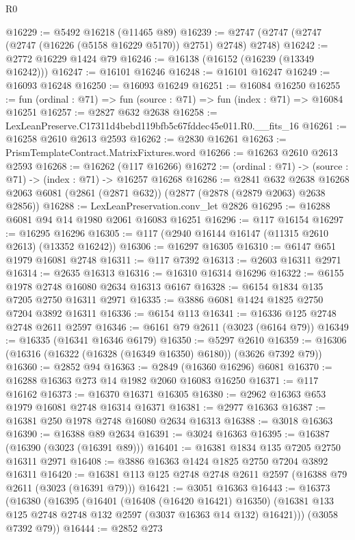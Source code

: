 \begin{lexlean}{R0}
\begin{coremodule}
@16229 := @5492 @16218 (@11465 @89)
@16239 := @2747 (@2747 (@2747 (@2747 (@16226 (@5158 @16229 @5170)) @2751) @2748) @2748)
@16242 := @2772 @16229 @1424 @79
@16246 := @16138 (@16152 (@16239 (@13349 @16242)))
@16247 := @16101 @16246
@16248 := @16101 @16247
@16249 := @16093 @16248
@16250 := @16093 @16249
@16251 := @16084 @16250
@16255 := fun (ordinal : @71) => fun (source : @71) => fun (index : @71) => @16084 @16251
@16257 := @2827 @632 @2638
@16258 := LexLeanPreserve.C17311d4bebd119bfb5c67fddec45e011.R0.__fits_16
@16261 := @16258 @2610 @2613 @2593
@16262 := @2830 @16261
@16263 := PrismTemplateContract.MatrixFixtures.word
@16266 := @16263 @2610 @2613 @2593
@16268 := @16262 (@117 @16266)
@16272 := (ordinal : @71) -> (source : @71) -> (index : @71) -> @16257 @16268
@16286 := @2841
    @632
    @2638
    @16268
    @2063
    @6081
    (@2861 (@2871 @632))
    (@2877 (@2878 (@2879 @2063) @2638 @2856))
@16288 := LexLeanPreservation.conv_let @2826
@16295 := @16288 @6081 @94 @14 @1980 @2061 @16083 @16251
@16296 := @117 @16154
@16297 := @16295 @16296
@16305 := @117 (@2940 @16144 @16147 (@11315 @2610 @2613) (@13352 @16242))
@16306 := @16297 @16305
@16310 := @6147 @651 @1979 @16081 @2748
@16311 := @117 @7392
@16313 := @2603 @16311 @2971
@16314 := @2635 @16313
@16316 := @16310 @16314 @16296
@16322 := @6155 @1978 @2748 @16080 @2634 @16313 @6167
@16328 := @6154 @1834 @135 @7205 @2750 @16311 @2971
@16335 := @3886 @6081 @1424 @1825 @2750 @7204 @3892 @16311
@16336 := @6154 @113
@16341 := @16336 @125 @2748 @2748 @2611 @2597
@16346 := @6161 @79 @2611 (@3023 (@6164 @79))
@16349 := @16335 (@16341 @16346 @6179)
@16350 := @5297 @2610
@16359 := @16306 (@16316 (@16322 (@16328 (@16349 @16350) @6180)) (@3626 @7392 @79))
@16360 := @2852 @94
@16363 := @2849 (@16360 @16296) @6081
@16370 := @16288 @16363 @273 @14 @1982 @2060 @16083 @16250
@16371 := @117 @16162
@16373 := @16370 @16371 @16305
@16380 := @2962 @16363 @653 @1979 @16081 @2748 @16314 @16371
@16381 := @2977 @16363
@16387 := @16381 @250 @1978 @2748 @16080 @2634 @16313
@16388 := @3018 @16363
@16390 := @16388 @89 @2634
@16391 := @3024 @16363
@16395 := @16387 (@16390 (@3023 (@16391 @89)))
@16401 := @16381 @1834 @135 @7205 @2750 @16311 @2971
@16408 := @3886 @16363 @1424 @1825 @2750 @7204 @3892 @16311
@16420 := @16381 @113 @125 @2748 @2748 @2611 @2597 (@16388 @79 @2611 (@3023 (@16391 @79)))
@16421 := @3051 @16363
@16443 := @16373
    (@16380
      (@16395
        (@16401
          (@16408 (@16420 @16421) @16350)
          (@16381 @133 @125 @2748 @2748 @132 @2597 (@3037 @16363 @14 @132) @16421)))
      (@3058 @7392 @79))
@16444 := @2852 @273

\end{coremodule}
\end{lexlean}
